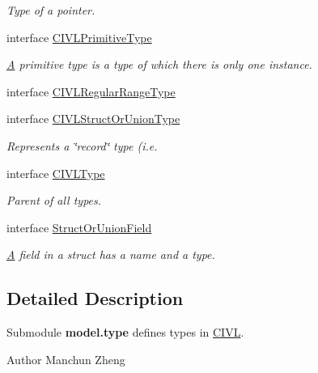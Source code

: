 \begin{DoxyCompactItemize}
\begin{DoxyCompactList}\small\item\em Type of a pointer. \end{DoxyCompactList}\item 
interface \hyperlink{interfaceedu_1_1udel_1_1cis_1_1vsl_1_1civl_1_1model_1_1IF_1_1type_1_1CIVLPrimitiveType}{C\+I\+V\+L\+Primitive\+Type}
\begin{DoxyCompactList}\small\item\em \hyperlink{structA}{A} primitive type is a type of which there is only one instance. \end{DoxyCompactList}\item 
interface \hyperlink{interfaceedu_1_1udel_1_1cis_1_1vsl_1_1civl_1_1model_1_1IF_1_1type_1_1CIVLRegularRangeType}{C\+I\+V\+L\+Regular\+Range\+Type}
\item 
interface \hyperlink{interfaceedu_1_1udel_1_1cis_1_1vsl_1_1civl_1_1model_1_1IF_1_1type_1_1CIVLStructOrUnionType}{C\+I\+V\+L\+Struct\+Or\+Union\+Type}
\begin{DoxyCompactList}\small\item\em Represents a \char`\"{}record\char`\"{} type (i.\+e. \end{DoxyCompactList}\item 
interface \hyperlink{interfaceedu_1_1udel_1_1cis_1_1vsl_1_1civl_1_1model_1_1IF_1_1type_1_1CIVLType}{C\+I\+V\+L\+Type}
\begin{DoxyCompactList}\small\item\em Parent of all types. \end{DoxyCompactList}\item 
interface \hyperlink{interfaceedu_1_1udel_1_1cis_1_1vsl_1_1civl_1_1model_1_1IF_1_1type_1_1StructOrUnionField}{Struct\+Or\+Union\+Field}
\begin{DoxyCompactList}\small\item\em \hyperlink{structA}{A} field in a struct has a name and a type. \end{DoxyCompactList}\end{DoxyCompactItemize}


\subsection{Detailed Description}
Submodule {\bfseries model.\+type} defines types in \hyperlink{classedu_1_1udel_1_1cis_1_1vsl_1_1civl_1_1CIVL}{C\+I\+V\+L}. 

\begin{DoxyAuthor}{Author}
Manchun Zheng 
\end{DoxyAuthor}
